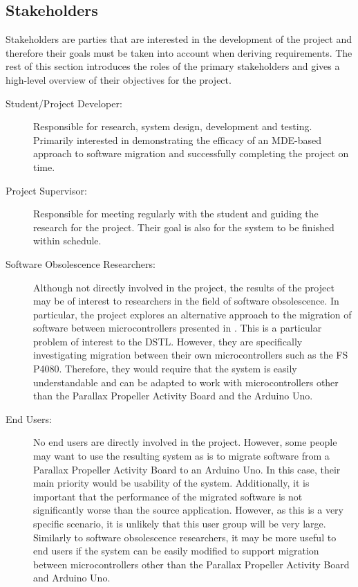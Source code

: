 \documentclass{UoYCSproject}
\begin{document}
\subsection{Stakeholders} \label{stakeholders}
Stakeholders are parties that are interested in the development of the project and therefore their goals must be taken into account when deriving requirements. The rest of this section introduces the roles of the primary stakeholders and gives a high-level overview of their objectives for the project.

\begin{description}
\item[Student/Project Developer:] Responsible for research, system design, development and testing. Primarily interested in demonstrating the efficacy of an MDE-based approach to software migration and successfully completing the project on time.

\item[Project Supervisor:] Responsible for meeting regularly with the student and guiding the research for the project. Their goal is also for the system to be finished within schedule.

\item[Software Obsolescence Researchers:] Although not directly involved in the project, the results of the project may be of interest to researchers in the field of software obsolescence. In particular, the project explores an alternative approach to the migration of software between microcontrollers presented in \parencite{gerasimou2017technical}. This is a particular problem of interest to the DSTL. However, they are specifically investigating migration between their own microcontrollers such as the FS P4080. Therefore, they would require that the system is easily understandable and can be adapted to work with microcontrollers other than the Parallax Propeller Activity Board and the Arduino Uno.

\item[End Users:] No end users are directly involved in the project. However, some people may want to use the resulting system as is to migrate software from a Parallax Propeller Activity Board to an Arduino Uno. In this case, their main priority would be usability of the system. Additionally, it is important that the performance of the migrated software is not significantly worse than the source application. However, as this is a very specific scenario, it is unlikely that this user group will be very large. Similarly to software obsolescence researchers, it may be more useful to end users if the system can be easily modified to support migration between microcontrollers other than the Parallax Propeller Activity Board and Arduino Uno.
\end{description}
\end{document}
